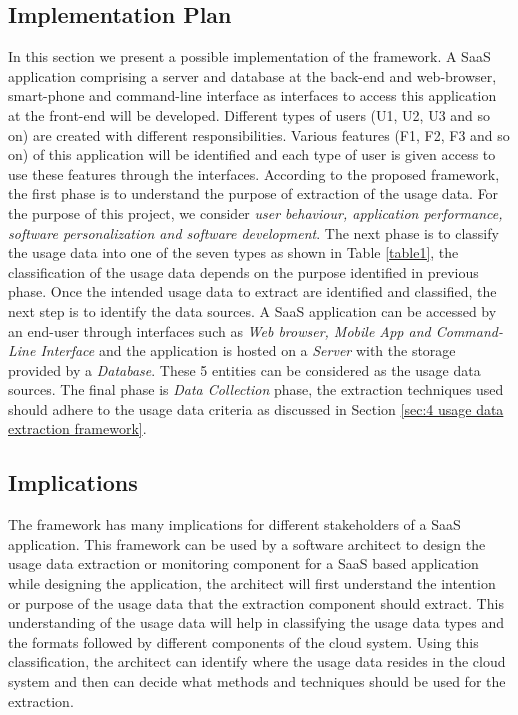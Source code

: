 \documentclass[a4paper,twoside]{article}
\begin{document}
\subsection{Implementation Plan}
\label{subsec:4.1 Implementation Plan}
In this section we present a possible implementation of the framework. A SaaS application comprising a server and  database at the back-end and web-browser, smart-phone and command-line interface as interfaces to access this application at the front-end will be developed. Different types of users (U1, U2, U3 and so on) are created with different responsibilities. Various features (F1, F2, F3 and so on) of this application will be identified and each type of user is given access to use these features through the interfaces. According to the proposed framework, the first phase is to understand the purpose of extraction of the usage data. For the purpose of this project, we consider \emph{user behaviour, application performance, software personalization and software development}. The next phase is to classify the usage data into one of the seven types as shown in Table \ref{table1}, the classification of the usage data depends on the purpose identified in previous phase. Once the intended usage data to extract are identified and classified, the next step is to identify the data sources. A SaaS application can be accessed by an end-user through interfaces such as \emph{Web browser, Mobile App and Command-Line Interface} and the application is hosted on a \emph{Server} with the storage provided by a \emph{Database}. These 5 entities can be considered as the usage data sources. The final phase is \emph{Data Collection} phase, the extraction techniques used should adhere to the usage data criteria as discussed in Section \ref{sec:4 usage data extraction framework}. 


\subsection{Implications}
\label{subsec:4.2 implications}

The framework has many implications for different stakeholders of a SaaS application. This framework can be used by a software architect to design the usage data extraction or monitoring component for a SaaS based application while designing the application, the architect will first understand the intention or purpose of the usage data that the extraction component should extract. This understanding of the usage data will help in classifying the usage data types and the formats followed by different components of the cloud system. Using this classification, the architect can identify where the usage data resides in the cloud system and then can decide what methods and techniques should be used for the extraction. 
\end{document}
